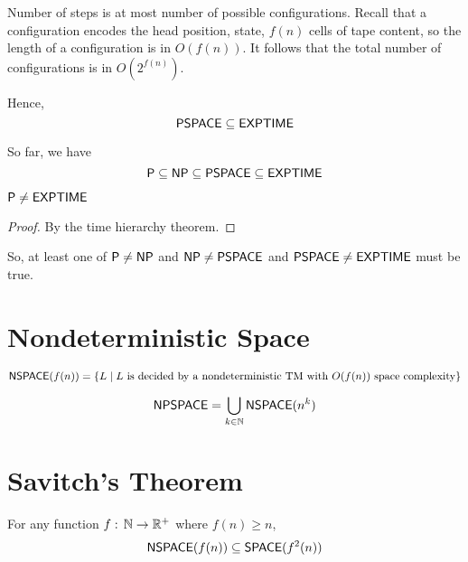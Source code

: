 Number of steps is at most number of possible configurations. Recall that a configuration encodes the head position, state, $f(n)$ cells of tape content, so the length of a configuration is in $O(f(n))$. It follows that the total number of configurations is in $O(2^{f(n)})$.

Hence,
$$
\mathsf{PSPACE} \subseteq \mathsf{EXPTIME}
$$

So far, we have
$$
\mathsf{P} \subseteq \mathsf{NP} \subseteq \mathsf{PSPACE} \subseteq \mathsf{EXPTIME}
$$

\begin{theorem}
    $
    \mathsf{P} \neq \mathsf{EXPTIME}
    $
\end{theorem}

\begin{proof}
    By the time hierarchy theorem.
\end{proof}

So, at least one of $\mathsf{P} \neq \mathsf{NP}$ and $\mathsf{NP} \neq \mathsf{PSPACE}$ and $\mathsf{PSPACE} \neq \mathsf{EXPTIME}$ must be true.

\section{Nondeterministic Space}

\begin{definition}[NSPACE]
    $$
    \mathsf{NSPACE}(f(n)) = \{ L \mid \text{$L$ is decided by a nondeterministic TM with $O(f(n))$ space complexity}\}
    $$
\end{definition}

\begin{definition}[NPSPACE]
    $$
    \mathsf{NPSPACE} = \bigcup_{k \in \mathbb{N}} \mathsf{NSPACE}(n^k)
    $$
\end{definition}

\section{Savitch's Theorem}

\begin{theorem}
    For any function $f:\,\mathbb{N} \to \mathbb{R}^+$ where $f(n) \geq n$,
    $$
    \mathsf{NSPACE}(f(n)) \subseteq \mathsf{SPACE}(f^2(n))
    $$
\end{theorem}

